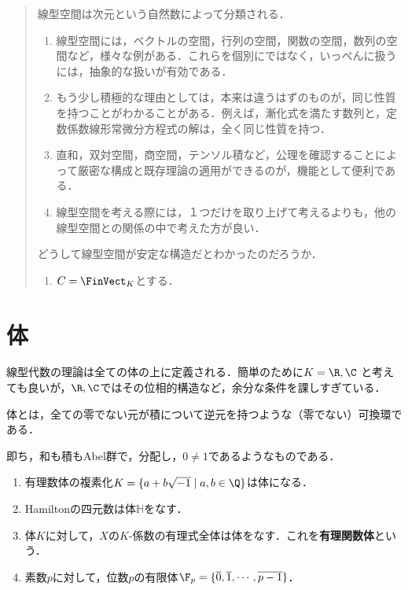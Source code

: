 \documentclass[uplatex, dvipdfmx]{jsreport}
\begin{document}
\begin{quotation}
    線型空間は次元という自然数によって分類される．
    \begin{enumerate}
        \item 線型空間には，ベクトルの空間，行列の空間，関数の空間，数列の空間など，様々な例がある．これらを個別にではなく，いっぺんに扱うには，抽象的な扱いが有効である．
        \item もう少し積極的な理由としては，本来は違うはずのものが，同じ性質を持つことがわかることがある．例えば，漸化式を満たす数列と，定数係数線形常微分方程式の解は，全く同じ性質を持つ．
        \item 直和，双対空間，商空間，テンソル積など，公理を確認することによって厳密な構成と既存理論の適用ができるのが，機能として便利である．
        \item 線型空間を考える際には，１つだけを取り上げて考えるよりも，他の線型空間との関係の中で考えた方が良い．
    \end{enumerate}
    どうして線型空間が安定な構造だとわかったのだろうか．
    \begin{notation}\mbox{}
        \begin{enumerate}
            \item $C=\FinVect_K$とする．
        \end{enumerate}
    \end{notation}
\end{quotation}

\section{体}

\begin{tcolorbox}[colframe=ForestGreen, colback=ForestGreen!10!white, breakable]
    線型代数の理論は全ての体の上に定義される．簡単のために$K=\R,\C$
    と考えても良いが，$\R,\C$ではその位相的構造など，余分な条件を課しすぎている．
\end{tcolorbox}

\begin{definition}
    体とは，全ての零でない元が積について逆元を持つような（零でない）可換環である．

    即ち，和も積もAbel群で，分配し，$0\ne 1$であるようなものである．
\end{definition}
\begin{example}\mbox{}
    \begin{enumerate}
        \item 有理数体の複素化$K=\{a+b\sqrt{-1}\mid a,b\in\Q\}$は体になる．
        \item Hamiltonの四元数は体$\mathbb{H}$をなす．
        \item 体$K$に対して，$X$の$K$-係数の有理式全体は体をなす．これを\textbf{有理関数体}という．
        \item 素数$p$に対して，位数$p$の有限体$\F_p=\{\overline{0},\overline{1},\cdots,\overline{p-1}\}$．
    \end{enumerate}
\end{example}
\end{document}
